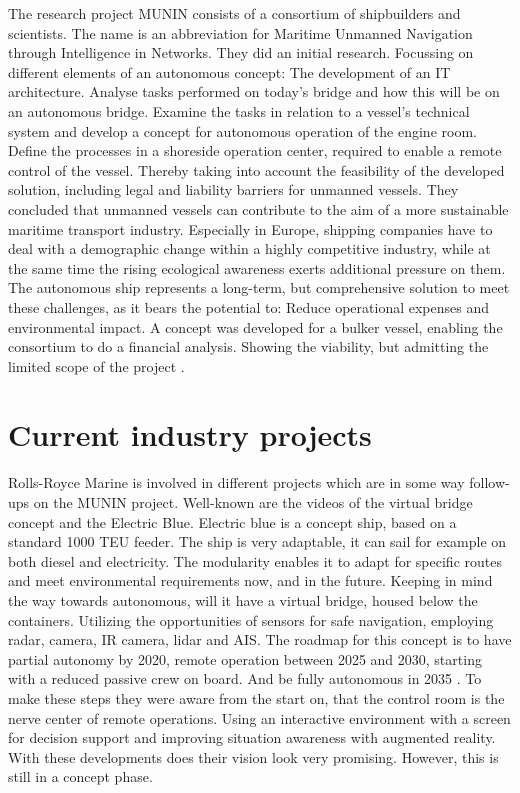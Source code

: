 The research project MUNIN consists of a consortium of shipbuilders and scientists. The name is an abbreviation for Maritime Unmanned Navigation through Intelligence in Networks. They did an initial research. Focussing on different elements of an autonomous concept: The development of an IT architecture. Analyse tasks performed on today's bridge and how this will be on an autonomous bridge. Examine the tasks in relation to a vessel’s technical system and develop a concept for autonomous operation of the engine room. Define the processes in a shoreside operation center, required to enable a remote control of the vessel. Thereby taking into account the feasibility of the developed solution, including legal and liability barriers for unmanned vessels.
They concluded that unmanned vessels can contribute to the aim of a more sustainable maritime transport industry. Especially in Europe, shipping companies have to deal with a demographic change within a highly competitive industry, while at the same time the rising ecological awareness exerts additional pressure on them. The autonomous ship represents a long-term, but comprehensive solution to meet these challenges, as it bears the potential to: Reduce operational expenses and
environmental impact.
A concept was developed for a bulker vessel, enabling the consortium to do a financial analysis. Showing the viability, but admitting the limited scope of the project \cite{MUNIN2016}.

\section{Current industry projects}
Rolls-Royce Marine is involved in different projects which are in some way follow-ups on the MUNIN project. Well-known are the videos of the virtual bridge concept and the Electric Blue. Electric blue is a concept ship, based on a standard 1000 \ac{TEU} feeder. The ship is very adaptable, it can sail for example on both diesel and electricity. The modularity enables it to adapt for specific routes and meet environmental requirements now, and in the future. 
Keeping in mind the way towards autonomous, will it have a virtual bridge, housed below the containers. Utilizing the opportunities of sensors for safe navigation, employing radar, camera, IR camera, lidar and \ac{AIS}. The roadmap for this concept is to have partial autonomy by 2020, remote operation between 2025 and 2030, starting with a reduced passive crew on board. And be fully autonomous in 2035 \cite{Wilson2017}. 
To make these steps they were aware from the start on, that the control room is the nerve center of remote operations. Using an interactive environment with a screen for decision support and improving situation awareness with augmented reality. With these developments does their vision look very promising. However, this is still in a concept phase.

